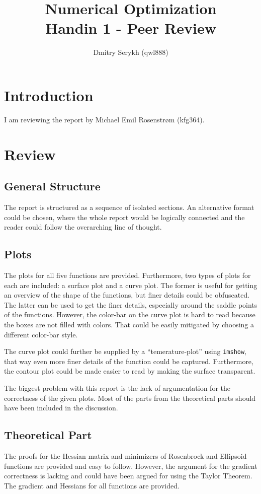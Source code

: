 \documentclass[a4paper]{article}
\title{\vspace{-5cm} Numerical Optimization \\ Handin 1 - Peer Review}
\author{Dmitry Serykh (qwl888)}
\begin{document}
\maketitle
\section{Introduction}
\label{intro}
I am reviewing the report by Michael Emil Rosenstrøm (kfg364).

\section{Review}
\label{sec:review}
\subsection{General Structure}
The report is structured as a sequence of isolated sections. An alternative
format could be chosen, where the whole report would be logically connected and
the reader could follow the overarching line of thought.

\subsection{Plots}
The plots for all five functions are provided. Furthermore, two types of plots
for each are included: a surface plot and a curve plot. The former is useful for
getting an overview of the shape of the functions, but finer details could be
obfuscated. The latter can be used to get the finer details, especially around
the saddle points of the functions. However, the color-bar on the curve plot is hard to read
because the boxes are not filled with colors. That could be easily mitigated by
choosing a different color-bar style.

The curve plot could further be supplied
by a ``temerature-plot'' using \texttt{imshow}, that way even more finer details
of the function could be captured. Furthermore, the contour plot could be made
easier to read by making the surface transparent.

The biggest problem with this report is the lack of argumentation for the
correctness of the given plots. Most of the parts from the theoretical parts
should have been included in the discussion.

\subsection{Theoretical Part}
The proofs for the Hessian matrix and minimizers of Rosenbrock and Ellipsoid
functions are provided and easy to follow. However, the argument for the
gradient correctness is lacking and could have been argued for using the Taylor
Theorem. The gradient and Hessians for all functions are provided.
\end{document}
